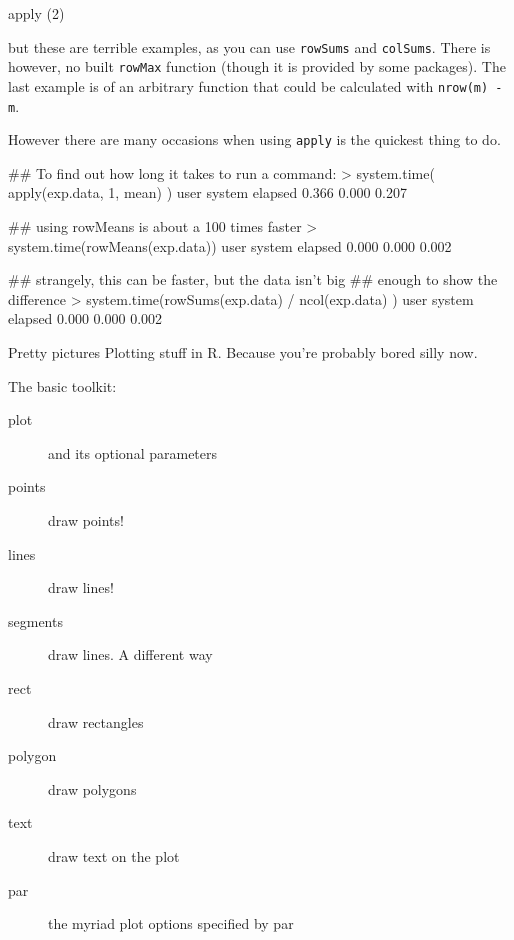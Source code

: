 \documentclass[pdf]{beamer}
\begin{document}
\begin{frame}[fragile]{apply (2)}

  {\small
  but these are terrible examples, as you can use \texttt{rowSums} and
  \texttt{colSums}. There is however, no built \texttt{rowMax} function 
  (though it is provided by some packages). The last example is of an
  arbitrary function that could be calculated with \texttt{nrow(m) - m}.
  
  However there are many occasions when using \texttt{apply} is the quickest
  thing to do.
}

  \begin{rcode}
    ## To find out how long it takes to run a command:
    > system.time( apply(exp.data, 1, mean) )
    user  system elapsed 
    0.366   0.000   0.207 

    ## using rowMeans is about a 100 times faster
    > system.time(rowMeans(exp.data))
    user  system elapsed 
    0.000   0.000   0.002 

    ## strangely, this can be faster, but the data isn't big
    ## enough to show the difference
    > system.time(rowSums(exp.data) / ncol(exp.data) )
    user  system elapsed 
    0.000   0.000   0.002 
  \end{rcode}

\end{frame}

\begin{frame}[fragile]{Pretty pictures}
  Plotting stuff in R. Because you're probably bored silly now.
  
  The basic toolkit:
  \begin{description}
  \item[plot] and its optional parameters
  \item[points] draw points!
  \item[lines] draw lines!
  \item[segments] draw lines. A different way
  \item[rect] draw rectangles
  \item[polygon] draw polygons
  \item[text] draw text on the plot
  \item[par] the myriad plot options specified by par
  \end{description}
\end{frame}
\end{document}
